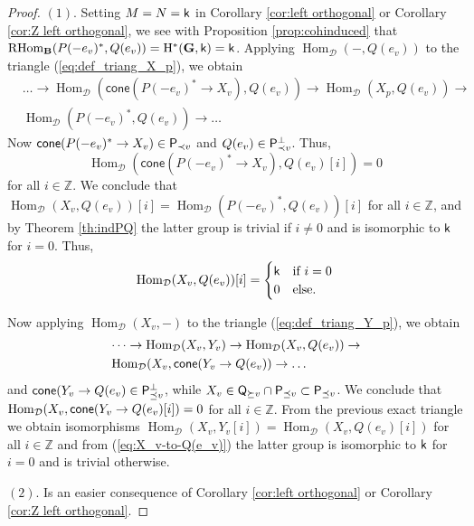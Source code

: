 \documentclass[sn-mathphys-num]{sn-jnl}%
\newcommand{\D}{\mathcal D}
\newcommand*{\Hom}{\mathop{\mathrm {Hom}}\nolimits}
\newcommand*{\RHom}{\mathop{\mathrm {RHom}}\nolimits}
\newcommand{\cone}{{\mathsf{cone}}}
\newcommand{\sk}{{\sf k}}
\newcommand{\bg}{\mathbf G}
\newcommand{\fb}{\mathbf B}
\def\text#1{\mbox{#1}}
\theoremstyle{definition}
\begin{document}
\begin{proof}
$(1).$ Setting $M=N=\sk$ in Corollary \ref{cor:left orthogonal} or Corollary \ref{cor:Z left orthogonal}, we see with Proposition \ref{prop:cohinduced}
that
$\RHom_{\fb}(P(-e_v)^*, Q(e_v))={\rm H}^{\ast}( \bg,\sk)=\sk$. 
Applying $\Hom_\D(-, Q(e_v))$ to the triangle (\ref{eq:def_triang_X_p}), we obtain 
\begin{eqnarray}
& \dots \rightarrow \Hom _{\D}(\cone(P(-e_v)^*\to X_v),Q(e_v))\rightarrow \Hom _{\D}(X_p,Q(e_v))\rightarrow \\ \nonumber 
& \Hom _{\D}(P(-e_v)^*,Q(e_v))\rightarrow \dots 
\end{eqnarray}
Now $\cone(P(-e_v)^*\to X_v)\in {\sf P}_{\prec v}$ and $Q(e_v)\in {\sf P}_{\prec v}^\perp$. 
Thus, $$\Hom_\D(\cone(P(-e_v)^*\to X_v), Q(e_v)[i])=0$$ for all $i\in \mathbb Z$. 
We conclude that $\Hom _{\D}(X_v,Q(e_v))[i]=\Hom _{\D}(P(-e_v)^*,Q(e_v))[i]$ for all $i\in \mathbb Z$, and by Theorem \ref{th:indPQ}
the latter group is trivial if $i\neq 0$ and is isomorphic to $\sf k$ for $i=0$. Thus, 
\begin{equation}\label{eq:X_v-to-Q(e_v)}
\Hom _{\D}(X_v,Q(e_v))[i]=\begin{cases}\sk &\text{if $i=0$}\\
0&\text{else.}\end{cases}
\end{equation}

Now applying $\Hom_\D(X_v,-)$ to the triangle (\ref{eq:def_triang_Y_p}), we obtain 
\begin{eqnarray}
& \dots \rightarrow \Hom _{\D}(X_v,Y_v)\rightarrow \Hom _{\D}(X_v,Q(e_v))\rightarrow \\ \nonumber 
& \Hom _{\D}(X_v,{\sf cone}(Y_v\rightarrow Q(e_v))\rightarrow \dots 
\end{eqnarray}
and ${\sf cone}(Y_v\rightarrow Q(e_v)\in{\sf P}_{\preceq v}^{\perp}$, 
while $X_v\in {\sf Q}_{\succeq v}\cap {\sf P}_{\preceq v}\subset {\sf P}_{\preceq v}$. 
We conclude that $\Hom _{\D}(X_v,{\sf cone}(Y_v\rightarrow Q(e_v)[i])=0$ for all $i\in \mathbb Z$. 
From the previous exact triangle we obtain isomorphisms $\Hom _{\D}(X_v,Y_v[i])=\Hom _{\D}(X_v,Q(e_v)[i])$ for all $i\in \mathbb Z$ and from (\ref{eq:X_v-to-Q(e_v)}) the latter group is isomorphic to $\sk$ for $i=0$ and is trivial otherwise. 



$(2).$ Is an easier consequence of Corollary \ref{cor:left orthogonal}  or Corollary \ref{cor:Z left orthogonal}.
\end{proof}
\end{document}
